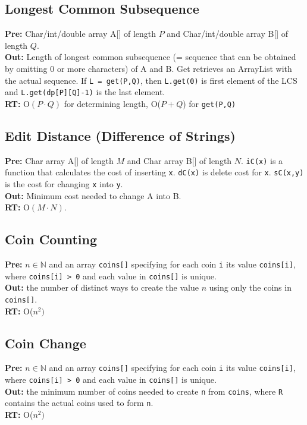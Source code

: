 \documentclass[a4paper,10pt]{article}
\newcommand{\N}{\mathbb{N}}
\begin{document}
\begin{multicols}{2}
\subsection{Longest Common Subsequence}
\textbf{Pre:} Char/int/double array A[] of length $P$ and Char/int/double array B[] of length $Q$.\\
\textbf{Out:} Length of longest common subsequence (= sequence that can be obtained by omitting 0 or more characters) of A and B. Get retrieves an ArrayList with the actual sequence. If \lstinline|L = get(P,Q)|, then \lstinline|L.get(0)| is first element of the LCS and \lstinline|L.get(dp[P][Q]-1)| is the last element.\\
\textbf{RT:} O$(P\cdot Q)$ for determining length, O($P+Q$) for \lstinline|get(P,Q)|




\subsection{Edit Distance (Difference of Strings)}
\textbf{Pre:} Char array A[] of length $M$ and Char array B[] of length $N$. \lstinline|iC(x)| is a function that calculates the cost of inserting \lstinline|x|. \lstinline|dC(x)| is delete cost for \lstinline|x|. \lstinline|sC(x,y)| is the cost for changing \lstinline|x| into \lstinline|y|.\\
\textbf{Out:} Minimum cost needed to change A into B.\\
\textbf{RT:} O$(M\cdot N)$.


\subsection{Coin Counting}
\textbf{Pre:} $n\in\N$ and an array \lstinline|coins[]| specifying for each coin \lstinline|i| its value \lstinline|coins[i]|, where \lstinline|coins[i] > 0| and each value in \lstinline|coins[]| is unique.\\
\textbf{Out:} the number of distinct ways to create the value $n$ using only the coins in \lstinline|coins[]|.\\
\textbf{RT:} O($n^2)$


\subsection{Coin Change}
\textbf{Pre:} $n\in\N$ and an array \lstinline|coins[]| specifying for each coin \lstinline|i| its value \lstinline|coins[i]|, where \lstinline|coins[i] > 0| and each value in \lstinline|coins[]| is unique.\\
\textbf{Out:} the minimum number of coins needed to create \lstinline|n| from \lstinline|coins|, where \lstinline|R| contains the actual coins used to form \lstinline|n|.\\
\textbf{RT:} O($n^2)$



\end{multicols}
\end{document}
